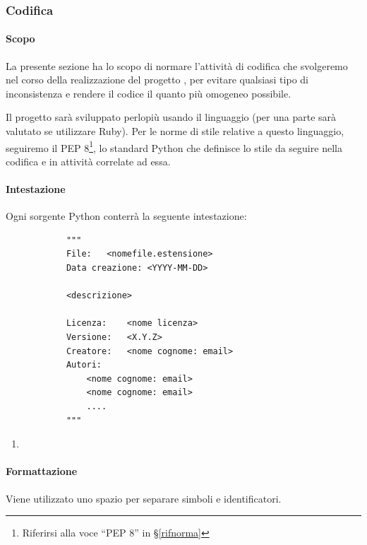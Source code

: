

        \newpage

		\subsubsection{Codifica}\label{PP:Sviluppo:Codifica}

		\paragraph{Scopo}
		La presente sezione ha lo scopo di normare l'attività di codifica che svolgeremo nel corso della realizzazione del progetto \progetto, per
		evitare qualsiasi tipo di inconsistenza e rendere il codice il quanto più omogeneo possibile.

		Il progetto sarà sviluppato perlopiù usando il linguaggio  (per una parte sarà valutato se utilizzare Ruby).
		Per le norme di stile relative a questo linguaggio, seguiremo il PEP 8\footnote{Riferirsi alla voce ``PEP 8'' in \S\ref{rifnorma}},
		lo standard Python che definisce lo stile da seguire nella codifica e in attività correlate ad essa.

        \paragraph{Intestazione}\label{PP:Sviluppo:Codifica:Intestazione}
		Ogni sorgente Python conterrà la seguente intestazione:
		\begin{verbatim}
			"""
			File:	<nomefile.estensione>
			Data creazione: <YYYY-MM-DD>

			<descrizione>

			Licenza:	<nome licenza>
			Versione:	<X.Y.Z>
			Creatore:	<nome cognome: email>
			Autori:
				<nome cognome: email>
				<nome cognome: email>
				....
			"""
		\end{verbatim}
        
        \begin{enumerate}
            \item 
        \end{enumerate}

		\paragraph{Formattazione}\label{PP:Sviluppo:Codifica:Formattazione}
		Viene utilizzato uno spazio per separare simboli e identificatori.
		


